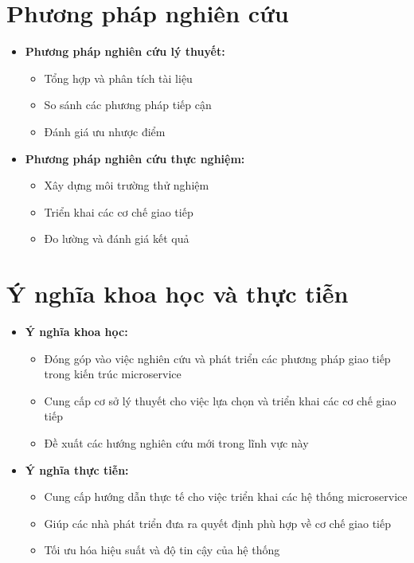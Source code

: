 \section{Phương pháp nghiên cứu}
\begin{itemize}
    \item \textbf{Phương pháp nghiên cứu lý thuyết:}
    \begin{itemize}
        \item Tổng hợp và phân tích tài liệu
        \item So sánh các phương pháp tiếp cận
        \item Đánh giá ưu nhược điểm
    \end{itemize}
    
    \item \textbf{Phương pháp nghiên cứu thực nghiệm:}
    \begin{itemize}
        \item Xây dựng môi trường thử nghiệm
        \item Triển khai các cơ chế giao tiếp
        \item Đo lường và đánh giá kết quả
    \end{itemize}
\end{itemize}

\section{Ý nghĩa khoa học và thực tiễn}
\begin{itemize}
    \item \textbf{Ý nghĩa khoa học:}
    \begin{itemize}
        \item Đóng góp vào việc nghiên cứu và phát triển các phương pháp giao tiếp trong kiến trúc microservice
        \item Cung cấp cơ sở lý thuyết cho việc lựa chọn và triển khai các cơ chế giao tiếp
        \item Đề xuất các hướng nghiên cứu mới trong lĩnh vực này
    \end{itemize}
    
    \item \textbf{Ý nghĩa thực tiễn:}
    \begin{itemize}
        \item Cung cấp hướng dẫn thực tế cho việc triển khai các hệ thống microservice
        \item Giúp các nhà phát triển đưa ra quyết định phù hợp về cơ chế giao tiếp
        \item Tối ưu hóa hiệu suất và độ tin cậy của hệ thống
    \end{itemize}
\end{itemize}


